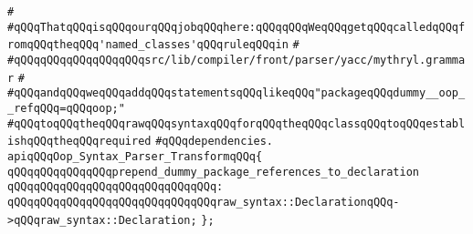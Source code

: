 \verb|#|\newline
\verb|#qQQqThatqQQqisqQQqourqQQqjobqQQqhere:qQQqqQQqWeqQQqgetqQQqcalledqQQqfromqQQqtheqQQq'named_classes'qQQqruleqQQqin|\newline
\verb|#|\newline
\verb|#qQQqqQQqqQQqqQQqqQQqsrc/lib/compiler/front/parser/yacc/mythryl.grammar|\newline
\verb|#|\newline
\verb|#qQQqandqQQqweqQQqaddqQQqstatementsqQQqlikeqQQq"packageqQQqdummy__oop__refqQQq=qQQqoop;"|\newline
\verb|#qQQqtoqQQqtheqQQqrawqQQqsyntaxqQQqforqQQqtheqQQqclassqQQqtoqQQqestablishqQQqtheqQQqrequired|\newline
\verb|#qQQqdependencies.|\newline
\newline
\verb|apiqQQqOop_Syntax_Parser_TransformqQQq{|\newline
\newline
\verb|qQQqqQQqqQQqqQQqprepend_dummy_package_references_to_declaration|\newline
\verb|qQQqqQQqqQQqqQQqqQQqqQQqqQQqqQQq:|\newline
\verb|qQQqqQQqqQQqqQQqqQQqqQQqqQQqqQQqraw_syntax::DeclarationqQQq->qQQqraw_syntax::Declaration;|\newline
\newline
\newline
\verb|};|\newline

